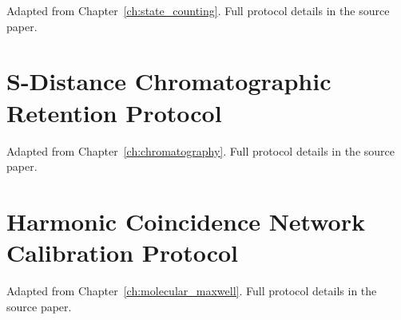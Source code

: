 Adapted from Chapter~\ref{ch:state_counting}. Full protocol details in the source paper.

\section{S-Distance Chromatographic Retention Protocol}

Adapted from Chapter~\ref{ch:chromatography}. Full protocol details in the source paper.

\section{Harmonic Coincidence Network Calibration Protocol}

Adapted from Chapter~\ref{ch:molecular_maxwell}. Full protocol details in the source paper.
